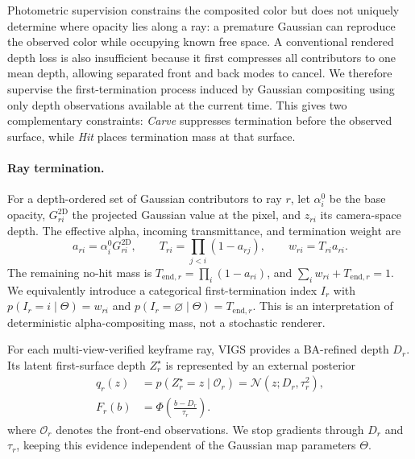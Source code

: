 Photometric supervision constrains the composited color but does not uniquely
determine where opacity lies along a ray: a premature Gaussian can reproduce
the observed color while occupying known free space. A conventional rendered
depth loss is also insufficient because it first compresses all contributors
to one mean depth, allowing separated front and back modes to cancel. We
therefore supervise the first-termination process induced by Gaussian
compositing using only depth observations available at the current time. This
gives two complementary constraints: \emph{Carve} suppresses termination before
the observed surface, while \emph{Hit} places termination mass at that surface.

\paragraph{Ray termination.}
For a depth-ordered set of Gaussian contributors to ray $r$, let
$\alpha_i^0$ be the base opacity, $G_{ri}^{\mathrm{2D}}$ the projected
Gaussian value at the pixel, and $z_{ri}$ its camera-space depth. The effective
alpha, incoming transmittance, and termination weight are
\begin{equation}\label{eq:ray_termination}
  a_{ri}=\alpha_i^0G_{ri}^{\mathrm{2D}},\qquad
  T_{ri}=\prod_{j<i}(1-a_{rj}),\qquad
  w_{ri}=T_{ri}a_{ri}.
\end{equation}
The remaining no-hit mass is
$T_{\mathrm{end},r}=\prod_i(1-a_{ri})$, and
$\sum_iw_{ri}+T_{\mathrm{end},r}=1$. We equivalently introduce a categorical
first-termination index $I_r$ with
$p(I_r=i\mid\Theta)=w_{ri}$ and
$p(I_r=\varnothing\mid\Theta)=T_{\mathrm{end},r}$. This is an interpretation
of deterministic alpha-compositing mass, not a stochastic renderer.

For each multi-view-verified keyframe ray, VIGS provides a BA-refined depth
$D_r$. Its latent first-surface depth $Z_r^\star$ is represented by an
external posterior
\begin{equation}\label{eq:surface_posterior}
  \begin{aligned}
  q_r(z)&=p(Z_r^\star=z\mid\mathcal O_r)
  =\mathcal N(z;D_r,\tau_r^2),\\
  F_r(b)&=\Phi\!\left(\frac{b-D_r}{\tau_r}\right).
  \end{aligned}
\end{equation}
where $\mathcal O_r$ denotes the front-end observations. We stop gradients
through $D_r$ and $\tau_r$, keeping this evidence independent of the Gaussian
map parameters $\Theta$.

